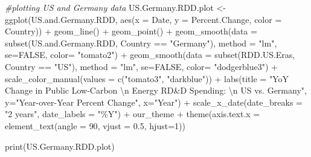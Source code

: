 \documentclass[
  12pt,
]{article}
\newenvironment{Shaded}{\begin{snugshade}}{\end{snugshade}}
\newcommand{\AttributeTok}[1]{\textcolor[rgb]{0.77,0.63,0.00}{#1}}
\newcommand{\CommentTok}[1]{\textcolor[rgb]{0.56,0.35,0.01}{\textit{#1}}}
\newcommand{\ConstantTok}[1]{\textcolor[rgb]{0.00,0.00,0.00}{#1}}
\newcommand{\DecValTok}[1]{\textcolor[rgb]{0.00,0.00,0.81}{#1}}
\newcommand{\FloatTok}[1]{\textcolor[rgb]{0.00,0.00,0.81}{#1}}
\newcommand{\FunctionTok}[1]{\textcolor[rgb]{0.00,0.00,0.00}{#1}}
\newcommand{\NormalTok}[1]{#1}
\newcommand{\OtherTok}[1]{\textcolor[rgb]{0.56,0.35,0.01}{#1}}
\newcommand{\SpecialCharTok}[1]{\textcolor[rgb]{0.00,0.00,0.00}{#1}}
\newcommand{\StringTok}[1]{\textcolor[rgb]{0.31,0.60,0.02}{#1}}
\begin{document}
\begin{Shaded}
\begin{Highlighting}[]
\CommentTok{\#plotting US and Germany data}
\NormalTok{US.Germany.RDD.plot }\OtherTok{\textless{}{-}} \FunctionTok{ggplot}\NormalTok{(US.and.Germany.RDD,}
                              \FunctionTok{aes}\NormalTok{(}\AttributeTok{x =}\NormalTok{ Date,}
                                  \AttributeTok{y =}\NormalTok{ Percent.Change, }
                                  \AttributeTok{color =}\NormalTok{ Country)) }\SpecialCharTok{+} 
  \FunctionTok{geom\_line}\NormalTok{() }\SpecialCharTok{+}
  \FunctionTok{geom\_point}\NormalTok{() }\SpecialCharTok{+}
  \FunctionTok{geom\_smooth}\NormalTok{(}\AttributeTok{data =} \FunctionTok{subset}\NormalTok{(US.and.Germany.RDD, Country }\SpecialCharTok{==} \StringTok{"Germany"}\NormalTok{), }\AttributeTok{method =} \StringTok{"lm"}\NormalTok{, }\AttributeTok{se=}\ConstantTok{FALSE}\NormalTok{, }\AttributeTok{color=} \StringTok{"tomato2"}\NormalTok{) }\SpecialCharTok{+}
  \FunctionTok{geom\_smooth}\NormalTok{(}\AttributeTok{data =} \FunctionTok{subset}\NormalTok{(RDD.US.Eras, Country }\SpecialCharTok{==} \StringTok{"US"}\NormalTok{), }\AttributeTok{method =} \StringTok{"lm"}\NormalTok{, }\AttributeTok{se=}\ConstantTok{FALSE}\NormalTok{, }\AttributeTok{color=} \StringTok{"dodgerblue3"}\NormalTok{) }\SpecialCharTok{+}
  \FunctionTok{scale\_color\_manual}\NormalTok{(}\AttributeTok{values =} \FunctionTok{c}\NormalTok{(}\StringTok{"tomato3"}\NormalTok{, }\StringTok{"darkblue"}\NormalTok{)) }\SpecialCharTok{+}
  \FunctionTok{labs}\NormalTok{(}\AttributeTok{title =} \StringTok{"YoY Change in Public Low{-}Carbon }\SpecialCharTok{\textbackslash{}n}\StringTok{ Energy RD\&D Spending: }\SpecialCharTok{\textbackslash{}n}\StringTok{ US vs. Germany"}\NormalTok{,}
       \AttributeTok{y=}\StringTok{"Year{-}over{-}Year Percent Change"}\NormalTok{,}
       \AttributeTok{x=}\StringTok{"Year"}\NormalTok{) }\SpecialCharTok{+} 
  \FunctionTok{scale\_x\_date}\NormalTok{(}\AttributeTok{date\_breaks =} \StringTok{"2 years"}\NormalTok{, }\AttributeTok{date\_labels =} \StringTok{"\%Y"}\NormalTok{) }\SpecialCharTok{+}
\NormalTok{  our\_theme }\SpecialCharTok{+}
  \FunctionTok{theme}\NormalTok{(}\AttributeTok{axis.text.x =} \FunctionTok{element\_text}\NormalTok{(}\AttributeTok{angle =} \DecValTok{90}\NormalTok{, }\AttributeTok{vjust =} \FloatTok{0.5}\NormalTok{, }\AttributeTok{hjust=}\DecValTok{1}\NormalTok{))}
  
\FunctionTok{print}\NormalTok{(US.Germany.RDD.plot)}
\end{Highlighting}
\end{Shaded}
\end{document}
